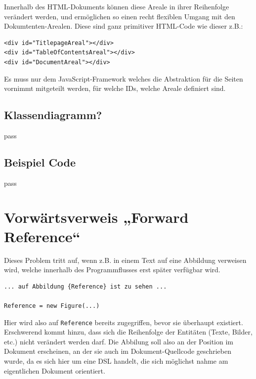 Innerhalb des HTML-Dokuments können diese Areale in ihrer Reihenfolge
verändert werden, und ermöglichen so einen recht flexiblen Umgang mit
den Dokumtenten-Arealen. Diese sind ganz primitiver HTML-Code wie dieser
z.B.:

\begin{verbatim}
<div id="TitlepageAreal"></div>
<div id="TableOfContentsAreal"></div>
<div id="DocumentAreal"></div>
\end{verbatim}

Es muss nur dem JavaScript-Framework welches die Abstraktion für die
Seiten vornimmt mitgeteilt werden, für welche IDs, welche Areale definiert
sind.

\subsection{Klassendiagramm?}

pass  %

\subsection{Beispiel Code}

pass %

\section{Vorwärtsverweis „Forward Reference“}\label{sec-forwardreference}

Dieses Problem tritt auf, wenn z.B. in einem Text auf eine Abbildung
verweisen wird, welche innerhalb des Programmflusses erst später verfügbar
wird.

\begin{lstlisting}
... auf Abbildung {Reference} ist zu sehen ...

Reference = new Figure(...)
\end{lstlisting}

Hier wird also auf \lstinline|Reference| bereits zugegriffen,
bevor sie überhaupt existiert. Erschwerend kommt hinzu, dass sich die
Reihenfolge der Entitäten (Texte, Bilder, etc.) nicht verändert werden darf.
Die Abbilung soll also an der Position im Dokument erscheinen, an der sie
auch im Dokument-Quellcode geschrieben wurde, da es sich hier um eine DSL
handelt, die sich möglichst nahme am eigentlichen Dokument orientiert.

